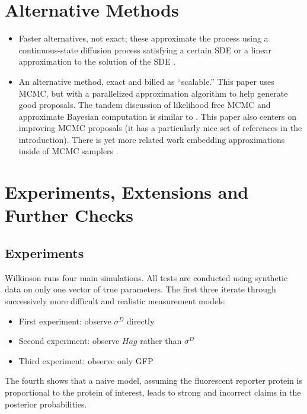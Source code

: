 \documentclass{article}
\begin{document}
\section{Alternative Methods}
\begin{itemize}
\item Faster alternatives, not exact; these approximate the process using a continuous-state diffusion process satisfying a certain SDE \cite{golightly2005bayesian} or a linear approximation to the solution of the SDE \cite{fearnhead2014inference}. 
\item An alternative method, exact and billed as ``scalable.'' This paper uses MCMC, but with a parallelized approximation algorithm to help generate good proposals\cite{owen2014scalable}. The tandem discussion of likelihood free MCMC and approximate Bayesian computation is similar to \cite{owen2014ABC_LF-MCMCcomparison}. This paper \cite{golightly2014smc_b_subtilis} also centers on improving MCMC proposals (it has a particularly nice set of references in the introduction). There is yet more related work embedding approximations inside of MCMC samplers
\cite{bayes_stoch_mod,milner2013moment}.
\end{itemize}

\section{Experiments, Extensions and Further Checks}
\subsection{Experiments}

Wilkinson runs four main simulations. All tests are conducted using synthetic data on only one vector of true parameters. The first three iterate through successively more difficult and realistic measurement models:
\begin{itemize}
\item First experiment: observe $\sigma^D$  directly
\item Second experiment: observe $Hag$ rather than $\sigma^D$
\item Third experiment: observe only GFP
\end{itemize}

The fourth shows that a naive model, assuming the fluorescent reporter protein is proportional to the protein of interest, leads to strong and incorrect claims in the posterior probabilities. 
\end{document}
